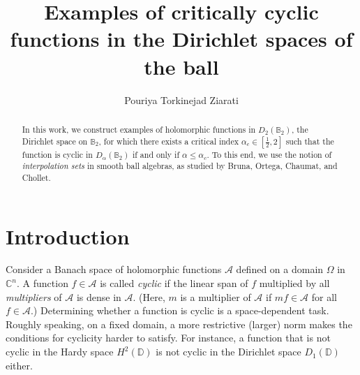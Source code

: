 \documentclass[a4paper,12pt]{amsart}
\theoremstyle{definition}
\theoremstyle{remark}
\def\D{\mathbb D}
\def\B{\mathbb{B}}
\begin{document}
	
	\title[Examples of critically cyclic functions in the Dirichlet spaces of the ball]
	{Examples of critically cyclic functions in the Dirichlet spaces of the ball}
	
	\author{Pouriya Torkinejad Ziarati}
	
	\address{P.T.Ziarati\\
		Institut de Math\'ematiques de Toulouse; UMR5219 \\
		Universit\'e de Toulouse; CNRS \\
		UPS, F-31062 Toulouse Cedex 9, France} 
	
	
	\begin{abstract}
              In this work, we construct examples of holomorphic functions in $D_2(\B_2)$, the Dirichlet space on $\B_2$, for which there exists a critical index $\alpha_c \in [\frac12,2]$ such that the function is cyclic in $D_\alpha(\B_2)$ if and only if $\alpha \leq \alpha_c$. To this end, we use the notion of \emph{interpolation sets} in smooth ball algebras, as studied by Bruna, Ortega, Chaumat, and Chollet.
        \end{abstract}

	
	
	
	
	\maketitle
\section{Introduction}
        
        Consider a Banach space of holomorphic functions $\mathcal{A}$ defined on a domain $\Omega$ in $\mathbb{C}^n$. A function $f \in \mathcal{A}$ is called \emph{cyclic} if the linear span of $f$ multiplied by all \emph{multipliers} of $\mathcal{A}$ is dense in $\mathcal{A}$. (Here, $m$ is a multiplier of $\mathcal{A}$ if $mf \in \mathcal{A}$ for all $f \in \mathcal{A}$.) Determining whether a function is cyclic is a space-dependent task. Roughly speaking, on a fixed domain, a more restrictive (larger) norm makes the conditions for cyclicity harder to satisfy. For instance, a function that is not cyclic in the Hardy space $H^2(\mathbb{D})$ is not cyclic in the Dirichlet space $D_1(\D)$ either.
\end{document}
